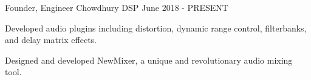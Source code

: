 

\begin{cventries}


    \cventry
    {Founder, Engineer} %
    {Chowdhury DSP} %
    {} %
    {June 2018 - PRESENT} %
    {
      \begin{cvitems} %
        \item {Developed audio plugins including distortion, dynamic range
               control, filterbanks, and delay matrix effects.}
        \item {Designed and developed NewMixer, a unique and revolutionary
               audio mixing tool.}
      \end{cvitems}
    }


\end{cventries}
